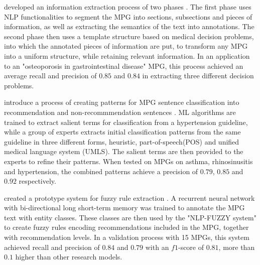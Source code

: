 \documentclass[bs, english]{stthesis}
\begin{document}
\citeauthor*{loglisciKnowledgeBasedFrameworkInformation2009} developed an information extraction process of two phases \cite{loglisciKnowledgeBasedFrameworkInformation2009}. The first phase uses NLP functionalities to segment the MPG into sections, subsections and pieces of information, as well as extracting the semantics of the text into annotations. The second phase then uses a template structure based on medical decision problems, into which the annotated pieces of information are put, to transform any MPG into a uniform structure, while retaining relevant information. In an application to an "osteoporosis in gastrointestinal disease" MPG, this process achieved an average recall and precision of $0.85$ and $0.84$ in extracting three different decision problems.

\citeauthor*{hussainTextClassificationClinical2021} introduce a process of creating patterns for MPG sentence classification into recommendation and non-recommmendation sentences \cite{hussainTextClassificationClinical2021}. ML algorithms are trained to extract salient terms for classification from a hypertension guideline, while a group of experts extracts initial classification patterns from the same guideline in three different forms, heuristic, part-of-speech(POS) and unified medical language system (UMLS). The salient terms are then provided to the experts to refine their patterns. When tested on MPGs on asthma, rhinosinusitis and hypertension, the combined patterns achieve a precision of $0.79$, $0.85$ and $0.92$ respectively.

\citeauthor*{fazlicNovelNLPFUZZYSystem2019} created a prototype system for fuzzy rule extraction \cite{fazlicNovelNLPFUZZYSystem2019}. A recurrent neural network with bi-directional long short-term memory was trained to annotate the MPG text with entity classes. These classes are then used by the "NLP-FUZZY system" to create fuzzy rules encoding recommendations included in the MPG, together with recommendation levels. In a validation process with 15 MPGs, this system achieved recall and precision of $0.84$ and $0.79$ with an $f1$-score of $0.81$, more than $0.1$ higher than other research models.

\end{document}
